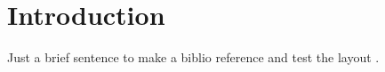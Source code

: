 \section{Introduction}

Just a brief sentence to make a biblio reference and test the layout \cite{thankachan2015probabilistic}.